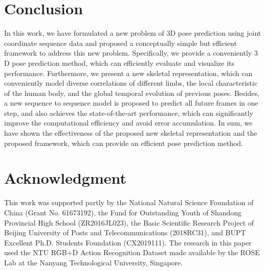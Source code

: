 \documentclass[journal]{IEEEtran}
\begin{document}
\section{Conclusion}
In this work, we have formulated a new problem of ${3}$D pose prediction using joint coordinate sequence data and proposed a conceptually simple but efficient framework to address this new problem. Specifically, we provide a conveniently ${3}$D pose prediction method, which can efficiently evaluate and visualize its performance. Furthermore, we present a new skeletal representation, which can conveniently model diverse correlations of different limbs, the local characteristic of the human body, and the global temporal evolution of previous poses. Besides, a new sequence to sequence model is proposed to predict all future frames in one step, and also achieves the state-of-the-art performance, which can significantly improve the computational efficiency and avoid error accumulation. In sum, we have shown the effectiveness of the proposed new skeletal representation and the proposed framework, which can provide an efficient pose prediction method.


\section*{Acknowledgment}

This work was supported partly by the National Natural Science Foundation of China (Grant No. 61673192), the Fund for Outstanding Youth of Shandong Provincial High School (ZR2016JL023), the Basic Scientific Research Project of Beijing University of Posts and Telecommunications (2018RC31), and BUPT Excellent Ph.D. Students Foundation (CX2019111). The research in this paper used the NTU RGB+D Action Recognition Dataset made available by the ROSE Lab at the Nanyang Technological University, Singapore.


\ifCLASSOPTIONcaptionsoff
  \newpage
\fi









\end{document}
